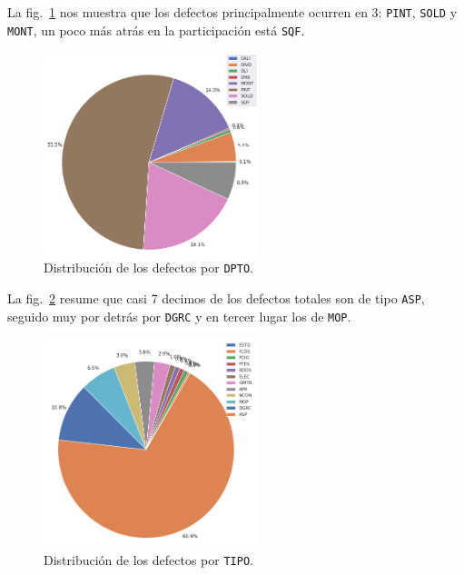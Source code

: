 \documentclass[a4paper,12pt]{article}
\begin{document}
		La fig.~\ref{fig:distgvddpto} nos muestra que los defectos principalmente ocurren en 3: \texttt{PINT}, \texttt{SOLD} y \texttt{MONT}, un poco más atrás en la participación está \texttt{SQF}.
						
		\begin{figure}[H]
			\begin{center}				
				\includegraphics[width=0.56\textwidth]{tesis_53.png}
				\caption{Distribución de los defectos por \texttt{DPTO}.}
				\label{fig:distgvddpto}
			\end{center}
		\end{figure}
						
		La fig.~\ref{fig:distgvdtype} resume que casi 7 decimos de los defectos totales son de tipo \texttt{ASP}, seguido muy por detrás por \texttt{DGRC} y en tercer lugar los de \texttt{MOP}.
						
		\begin{figure}[H]
			\begin{center}				
				\includegraphics[width=0.56\textwidth]{tesis_55.png}
				\caption{Distribución de los defectos por \texttt{TIPO}.}
				\label{fig:distgvdtype}
			\end{center}
		\end{figure}
						
\end{document}
